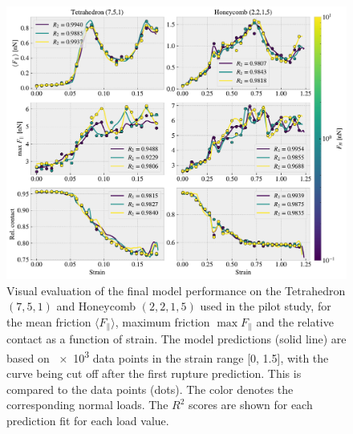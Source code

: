 \begin{figure}[H]
  \centering
  \includegraphics[width=\linewidth]{figures/ML/final_model_evaluation.pdf}
  \caption{Visual evaluation of the final model performance on the Tetrahedron $(7,5,1)$ and Honeycomb $(2,2,1,5)$ used in the pilot study, for the mean friction $\langle F_{\parallel} \rangle$, maximum friction $\max F_\parallel$ and the relative contact as a function of strain. The model predictions (solid line) are based on \num{e3} data points in the strain range [0, 1.5], with the curve being cut off after the first rupture prediction. This is compared to the data points (dots). The color denotes the corresponding normal loads. The $R^2$ scores are shown for each prediction fit for each load value.}
  \label{fig:final_model_eval}
\end{figure}  



